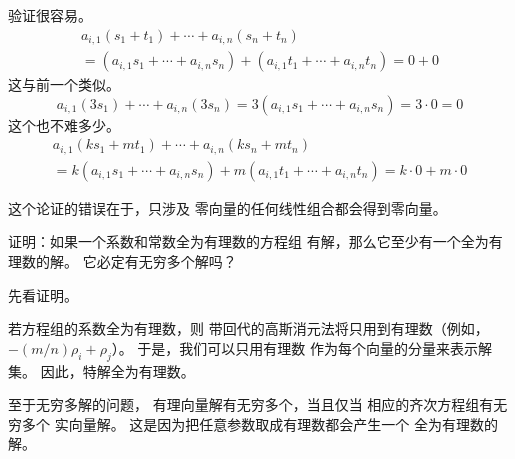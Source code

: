 \begin{exercises}
\begin{answer}
\begin{exparts}
        \partsitem 验证很容易。
          \begin{multline*}
            a_{i,1}(s_1+t_1)+\cdots+a_{i,n}(s_n+t_n)      \\
            =
            (a_{i,1}s_1+\cdots+a_{i,n}s_n)
            +(a_{i,1}t_1+\cdots+a_{i,n}t_n)
            =
            0+0
          \end{multline*}
        \partsitem 这与前一个类似。
          \begin{equation*}
            a_{i,1}(3s_1)+\cdots+a_{i,n}(3s_n)
            =3(a_{i,1}s_1+\cdots+a_{i,n}s_n)
            =3\cdot 0=0
          \end{equation*}
        \partsitem 这个也不难多少。
          \begin{multline*}
            a_{i,1}(ks_1+mt_1)+\cdots+a_{i,n}(ks_n+mt_n)  \\
            =
            k(a_{i,1}s_1+\cdots+a_{i,n}s_n)
            +m(a_{i,1}t_1+\cdots+a_{i,n}t_n)
            =
            k\cdot 0+m\cdot 0
          \end{multline*}
      \end{exparts}
     这个论证的错误在于，只涉及
     零向量的任何线性组合都会得到零向量。
   \end{answer}
  \item
    证明：如果一个系数和常数全为有理数的方程组
    有解，那么它至少有一个全为有理数的解。
    它必定有无穷多个解吗？
    \begin{answer}
      先看证明。

      若方程组的系数全为有理数，则
      带回代的高斯消元法将只用到有理数（例如，
      \( -(m/n)\rho_i+\rho_j \)）。
      于是，我们可以只用有理数
      作为每个向量的分量来表示解集。
      因此，特解全为有理数。

      至于无穷多解的问题，
      有理向量解有无穷多个，当且仅当
      相应的齐次方程组有无穷多个
      实向量解。
      这是因为把任意参数取成有理数都会产生一个
      全为有理数的解。
   \end{answer}
\end{exercises}

\endinput

